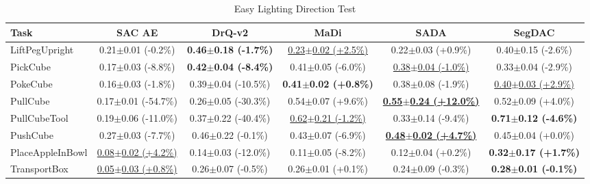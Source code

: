 \begin{table}[htbp]
\centering
\scriptsize
\caption{Easy Lighting Direction Test}
\label{tab:appendix_lightingdirectiontest_easy}
\begin{adjustbox}{max width=\textwidth}
\begin{tabular}{l*{5}{c}}
\toprule
\textbf{Task} & \textbf{SAC AE} & \textbf{DrQ-v2} & \textbf{MaDi} & \textbf{SADA} & \textbf{SegDAC} \\
\midrule
LiftPegUpright & 0.21$\pm$0.01 \scriptsize{(-0.2\%)} & \textbf{0.46$\pm$0.18 \scriptsize{(-1.7\%)}} & \underline{0.23$\pm$0.02 \scriptsize{(+2.5\%)}} & 0.22$\pm$0.03 \scriptsize{(+0.9\%)} & 0.40$\pm$0.15 \scriptsize{(-2.6\%)} \\
PickCube & 0.17$\pm$0.03 \scriptsize{(-8.8\%)} & \textbf{0.42$\pm$0.04 \scriptsize{(-8.4\%)}} & 0.41$\pm$0.05 \scriptsize{(-6.0\%)} & \underline{0.38$\pm$0.04 \scriptsize{(-1.0\%)}} & 0.33$\pm$0.04 \scriptsize{(-2.9\%)} \\
PokeCube & 0.16$\pm$0.03 \scriptsize{(-1.8\%)} & 0.39$\pm$0.04 \scriptsize{(-10.5\%)} & \textbf{0.41$\pm$0.02 \scriptsize{(+0.8\%)}} & 0.38$\pm$0.08 \scriptsize{(-1.9\%)} & \underline{0.40$\pm$0.03 \scriptsize{(+2.9\%)}} \\
PullCube & 0.17$\pm$0.01 \scriptsize{(-54.7\%)} & 0.26$\pm$0.05 \scriptsize{(-30.3\%)} & 0.54$\pm$0.07 \scriptsize{(+9.6\%)} & \textbf{\underline{0.55$\pm$0.24 \scriptsize{(+12.0\%)}}} & 0.52$\pm$0.09 \scriptsize{(+4.0\%)} \\
PullCubeTool & 0.19$\pm$0.06 \scriptsize{(-11.0\%)} & 0.37$\pm$0.22 \scriptsize{(-40.4\%)} & \underline{0.62$\pm$0.21 \scriptsize{(-1.2\%)}} & 0.33$\pm$0.14 \scriptsize{(-9.4\%)} & \textbf{0.71$\pm$0.12 \scriptsize{(-4.6\%)}} \\
PushCube & 0.27$\pm$0.03 \scriptsize{(-7.7\%)} & 0.46$\pm$0.22 \scriptsize{(-0.1\%)} & 0.43$\pm$0.07 \scriptsize{(-6.9\%)} & \textbf{\underline{0.48$\pm$0.02 \scriptsize{(+4.7\%)}}} & 0.45$\pm$0.04 \scriptsize{(+0.0\%)} \\
PlaceAppleInBowl & \underline{0.08$\pm$0.02 \scriptsize{(+4.2\%)}} & 0.14$\pm$0.03 \scriptsize{(-12.0\%)} & 0.11$\pm$0.05 \scriptsize{(-8.2\%)} & 0.12$\pm$0.04 \scriptsize{(+0.2\%)} & \textbf{0.32$\pm$0.17 \scriptsize{(+1.7\%)}} \\
TransportBox & \underline{0.05$\pm$0.03 \scriptsize{(+0.8\%)}} & 0.26$\pm$0.07 \scriptsize{(-0.5\%)} & 0.26$\pm$0.01 \scriptsize{(+0.1\%)} & 0.24$\pm$0.09 \scriptsize{(-0.3\%)} & \textbf{0.28$\pm$0.01 \scriptsize{(-0.1\%)}} \\
\bottomrule
\end{tabular}
\end{adjustbox}
\end{table}

